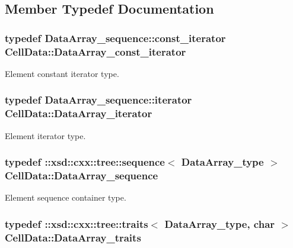 \subsection{Member Typedef Documentation}
\hypertarget{classCellData_a8213ea10f002fac23b5555ca0b2b2a21}{
\subsubsection[{Data\-Array\-\_\-const\-\_\-iterator}]{\setlength{\rightskip}{0pt plus 5cm}typedef Data\-Array\-\_\-sequence\-::const\-\_\-iterator {\bf Cell\-Data\-::\-Data\-Array\-\_\-const\-\_\-iterator}}}\label{classCellData_a8213ea10f002fac23b5555ca0b2b2a21}


Element constant iterator type. 

\hypertarget{classCellData_abe0f5b0713690cc81703132bcdccd51f}{
\subsubsection[{Data\-Array\-\_\-iterator}]{\setlength{\rightskip}{0pt plus 5cm}typedef Data\-Array\-\_\-sequence\-::iterator {\bf Cell\-Data\-::\-Data\-Array\-\_\-iterator}}}\label{classCellData_abe0f5b0713690cc81703132bcdccd51f}


Element iterator type. 

\hypertarget{classCellData_a52b0c8e18ccdb06ed9e6ae76cd809c4a}{
\subsubsection[{Data\-Array\-\_\-sequence}]{\setlength{\rightskip}{0pt plus 5cm}typedef \-::xsd\-::cxx\-::tree\-::sequence$<$ {\bf Data\-Array\-\_\-type} $>$ {\bf Cell\-Data\-::\-Data\-Array\-\_\-sequence}}}\label{classCellData_a52b0c8e18ccdb06ed9e6ae76cd809c4a}


Element sequence container type. 

\hypertarget{classCellData_a03e76eec5af05a6ac5512e9cb80300bd}{
\subsubsection[{Data\-Array\-\_\-traits}]{\setlength{\rightskip}{0pt plus 5cm}typedef \-::xsd\-::cxx\-::tree\-::traits$<$ {\bf Data\-Array\-\_\-type}, char $>$ {\bf Cell\-Data\-::\-Data\-Array\-\_\-traits}}}\label{classCellData_a03e76eec5af05a6ac5512e9cb80300bd}


